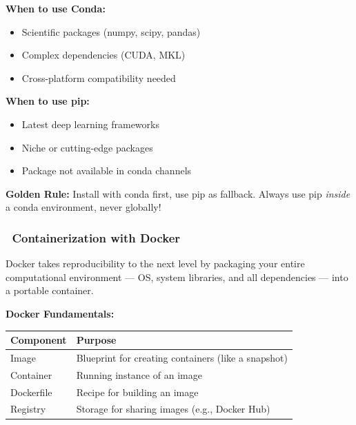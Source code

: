 \documentclass[11pt,a4paper]{article}
\begin{document}
\begin{tcolorbox}[colback=yellow!5,colframe=orange!60,title={Pro Tip: Conda vs pip}]
\textbf{When to use Conda:}
\begin{itemize}
    \item Scientific packages (numpy, scipy, pandas)
    \item Complex dependencies (CUDA, MKL)
    \item Cross-platform compatibility needed
\end{itemize}

\textbf{When to use pip:}
\begin{itemize}
    \item Latest deep learning frameworks
    \item Niche or cutting-edge packages
    \item Package not available in conda channels
\end{itemize}

\textbf{Golden Rule:} Install with conda first, use pip as fallback. Always use pip \textit{inside} a conda environment, never globally!
\end{tcolorbox}

\subsubsection{\faDocker~Containerization with Docker}

Docker takes reproducibility to the next level by packaging your entire computational environment — OS, system libraries, and all dependencies — into a portable container.

\textbf{Docker Fundamentals:}

\begin{tcolorbox}[colback=purple!5,colframe=purple!40,title={Docker Architecture}]
\begin{center}
\begin{tabular}{ll}
\textbf{Component} & \textbf{Purpose} \\
\midrule
Image & Blueprint for creating containers (like a snapshot) \\
Container & Running instance of an image \\
Dockerfile & Recipe for building an image \\
Registry & Storage for sharing images (e.g., Docker Hub) \\
\end{tabular}
\end{center}
\end{tcolorbox}
\end{document}

